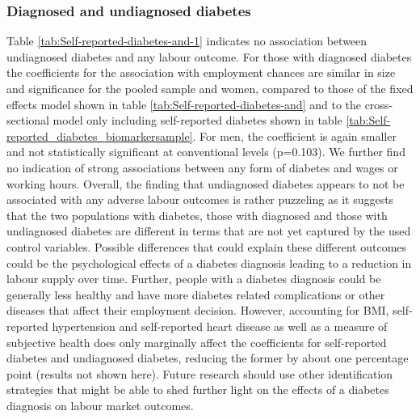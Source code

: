 \subsubsection*{Diagnosed and undiagnosed diabetes}

Table \ref{tab:Self-reported-diabetes-and-1}
indicates no association between undiagnosed
diabetes and any labour outcome. For those with diagnosed
diabetes the coefficients for the association with employment chances
are similar in size and significance for the pooled sample and women,
compared to those of the fixed effects model shown in table \ref{tab:Self-reported-diabetes-and} and to the cross-sectional model only including self-reported diabetes shown in table \ref{tab:Self-reported_diabetes_biomarkersample}.
For men, the coefficient is again smaller and not statistically significant
at conventional levels (p=0.103). We further find no indication of strong associations
between any form of diabetes and wages or working hours. 
Overall, the finding that undiagnosed diabetes appears to not be associated with any adverse labour outcomes is rather puzzeling as it suggests that the two populations with diabetes, those with diagnosed and those with undiagnosed diabetes are different in terms that are not yet captured by the used control variables. Possible differences that could explain these different outcomes could be the psychological effects of a diabetes diagnosis leading to a reduction in labour supply over time. Further, people with a diabetes diagnosis could be generally less healthy and have more diabetes related complications or other diseases that affect their employment decision. However, accounting for BMI, self-reported hypertension and self-reported heart disease as well as a measure of subjective health does only marginally affect the coefficients for self-reported diabetes and undiagnosed diabetes, reducing the former by about one percentage point (results not shown here). Future research should use other identification strategies that might be able to shed further light on the effects of a diabetes diagnosis on labour market outcomes.

